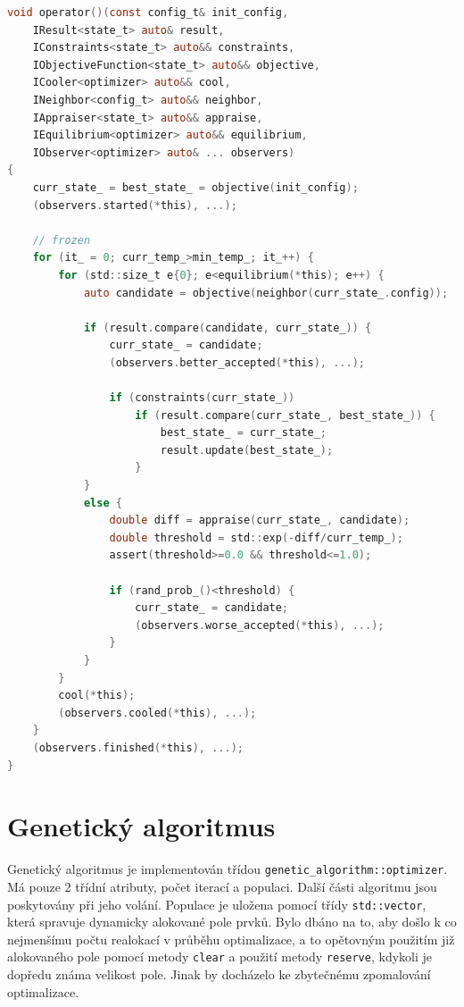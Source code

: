 \begin{lstlisting}[caption={~Implementace simulovaného ochlazování},label={lst:simulated:annealing},captionpos=t,abovecaptionskip=-\medskipamount,belowcaptionskip=\medskipamount,language=C]
void operator()(const config_t& init_config,
    IResult<state_t> auto& result,
    IConstraints<state_t> auto&& constraints,
    IObjectiveFunction<state_t> auto&& objective,
    ICooler<optimizer> auto&& cool,
    INeighbor<config_t> auto&& neighbor,
    IAppraiser<state_t> auto&& appraise,
    IEquilibrium<optimizer> auto&& equilibrium,
    IObserver<optimizer> auto& ... observers)
{
    curr_state_ = best_state_ = objective(init_config);
    (observers.started(*this), ...);

    // frozen
    for (it_ = 0; curr_temp_>min_temp_; it_++) {
        for (std::size_t e{0}; e<equilibrium(*this); e++) {
            auto candidate = objective(neighbor(curr_state_.config));

            if (result.compare(candidate, curr_state_)) {
                curr_state_ = candidate;
                (observers.better_accepted(*this), ...);

                if (constraints(curr_state_))
                    if (result.compare(curr_state_, best_state_)) {
                        best_state_ = curr_state_;
                        result.update(best_state_);
                    }
            }
            else {
                double diff = appraise(curr_state_, candidate);
                double threshold = std::exp(-diff/curr_temp_);
                assert(threshold>=0.0 && threshold<=1.0);

                if (rand_prob_()<threshold) {
                    curr_state_ = candidate;
                    (observers.worse_accepted(*this), ...);
                }
            }
        }
        cool(*this);
        (observers.cooled(*this), ...);
    }
    (observers.finished(*this), ...);
}
\end{lstlisting}

\section{Genetický algoritmus}
Genetický algoritmus je implementován třídou \texttt{genetic\_algorithm::optimizer}.
Má pouze 2 třídní atributy, počet iterací a populaci.
Další části algoritmu jsou poskytovány při jeho volání.
Populace je uložena pomocí třídy \texttt{std::vector}, která spravuje dynamicky alokované pole prvků.
Bylo dbáno na to, aby došlo k co nejmenšímu počtu realokací v průběhu optimalizace, a to opětovným použitím již alokovaného pole pomocí metody \texttt{clear} a použití metody \texttt{reserve}, kdykoli je dopředu známa velikost pole.
Jinak by docházelo ke zbytečnému zpomalování optimalizace.


